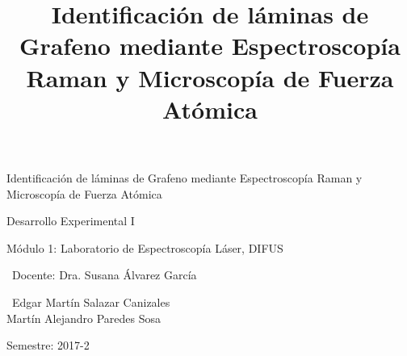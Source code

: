 \documentclass[12pt,letterpaper]{article}
\title{Identificación de láminas de Grafeno mediante Espectroscopía Raman y Microscopía de Fuerza Atómica}
\begin{document}
\begin{titlepage}
	\centering
    \vspace*{2cm}
	{\Huge Identificación de láminas de Grafeno mediante Espectroscopía Raman y Microscopía de Fuerza Atómica \par}
	\vfill
	{\Large Desarrollo Experimental I \par}
	\vfill
	{\Large Módulo 1: Laboratorio de Espectroscopía Láser, DIFUS \par}
	\vfill
	{\large\ Docente: Dra. Susana Álvarez García \par}
    \vfill
    {\large\ Edgar Martín Salazar Canizales\\
			 Martín Alejandro Paredes Sosa \par}
	\vfill
	{\large Semestre: 2017-2\par}
\end{titlepage}
\end{document}
